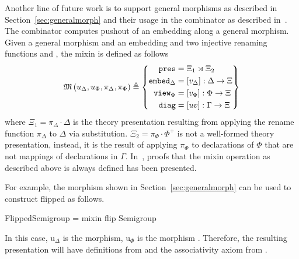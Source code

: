 Another line of future work is to support general morphisms as described in Section~\ref{sec:generalmorph} and their usage in the  combinator as described in~\cite{carette2018building}. 
The  combinator computes pushout of an embedding along a general morphism. Given a general morphism  and an embedding  and two injective renaming functions 
and , the mixin is defined as follows 
\[
\mathfrak{M}\left( u_{\Delta}, u_{\Phi}, \pi_{\Delta}, \pi_{\Phi}\right) \triangleq
\left\{\begin{aligned}
  \mathtt{pres} & = \Xi_1\rtimes\Xi_2 \\
  \mathtt{embed}_{\Delta} & = \left[v_{\Delta}\right] : \Delta\rightarrow\Xi\\
  \mathtt{view}_{\Phi} & = \left[v_{\Phi}\right] : \Phi\rightarrow\Xi\\
  \mathtt{diag} & = \left[uv\right]:\Gamma\rightarrow\Xi\\
\end{aligned}\right\}
\]
where $\Xi_1 = \pi_\Delta \cdot \Delta$ is the theory presentation resulting from applying the rename function $\pi_\Delta$ to $\Delta$ via substitution. 
$\Xi_2 = \pi_\Phi \cdot \Phi^+$ is not a well-formed theory presentation, instead, it is the result of applying $\pi_\Phi$ to declarations of $\Phi$ that are not mappings of declarations in $\Gamma$. 
In~\cite{carette2018building}, proofs that the mixin operation as described above is always defined has been presented. 

For example, the morphism  shown in Section~\ref{sec:generalmorph} can be used to construct flipped  as follows. 
\begin{togcode} 
FlippedSemigroup = mixin flip {} Semigroup {} 
\end{togcode} 
In this case, $\text{u}_\Delta$ is the  morphism, $\text{u}_\Phi$ is the morphism . Therefore, the resulting presentation  will have definitions from  and the associativity axiom from . 

